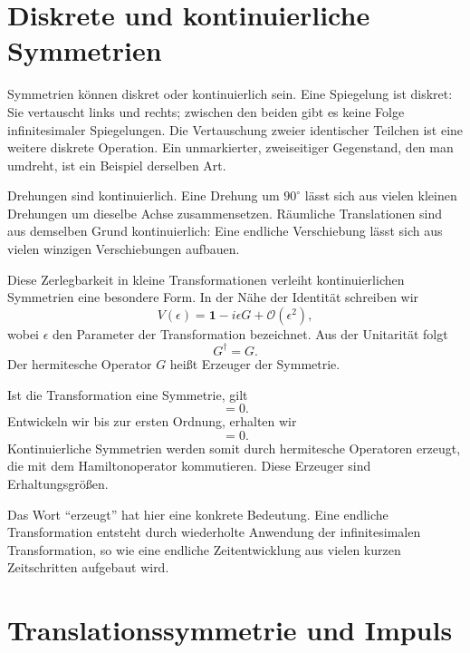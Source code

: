 \section{Diskrete und kontinuierliche Symmetrien}

Symmetrien können diskret oder kontinuierlich sein. Eine Spiegelung ist diskret: Sie vertauscht links und rechts; zwischen den beiden gibt es keine Folge infinitesimaler Spiegelungen. Die Vertauschung zweier identischer Teilchen ist eine weitere diskrete Operation. Ein unmarkierter, zweiseitiger Gegenstand, den man umdreht, ist ein Beispiel derselben Art.

Drehungen sind kontinuierlich. Eine Drehung um \(90^\circ\) lässt sich aus vielen kleinen Drehungen um dieselbe Achse zusammensetzen. Räumliche Translationen sind aus demselben Grund kontinuierlich: Eine endliche Verschiebung lässt sich aus vielen winzigen Verschiebungen aufbauen.

Diese Zerlegbarkeit in kleine Transformationen verleiht kontinuierlichen Symmetrien eine besondere Form. In der Nähe der Identität schreiben wir
\begin{equation}
V(\epsilon)
=
\mathbf 1-i\epsilon G+\mathcal O(\epsilon^2),
\end{equation}
wobei \(\epsilon\) den Parameter der Transformation bezeichnet. Aus der Unitarität folgt
\begin{equation}
G^\dagger=G.
\end{equation}
Der hermitesche Operator \(G\) heißt Erzeuger der Symmetrie.

Ist die Transformation eine Symmetrie, gilt
\begin{equation}
[H,V(\epsilon)]=0.
\end{equation}
Entwickeln wir bis zur ersten Ordnung, erhalten wir
\begin{equation}
[H,G]=0.
\end{equation}
Kontinuierliche Symmetrien werden somit durch hermitesche Operatoren erzeugt, die mit dem Hamiltonoperator kommutieren. Diese Erzeuger sind Erhaltungsgrößen.

Das Wort ``erzeugt'' hat hier eine konkrete Bedeutung. Eine endliche Transformation entsteht durch wiederholte Anwendung der infinitesimalen Transformation, so wie eine endliche Zeitentwicklung aus vielen kurzen Zeitschritten aufgebaut wird.

\section{Translationssymmetrie und Impuls}

